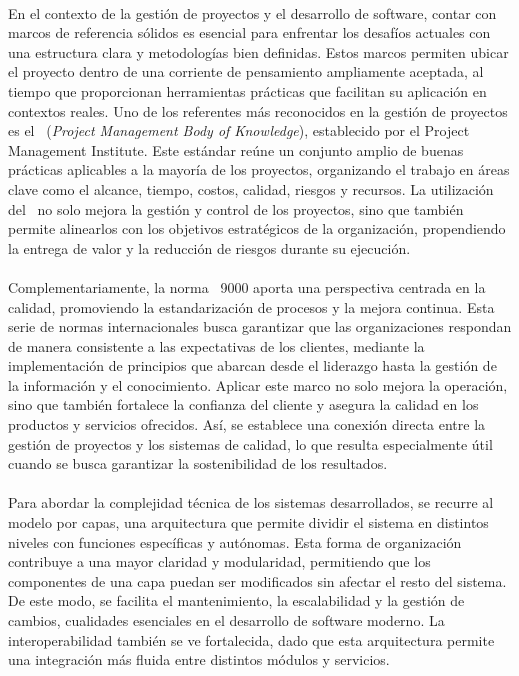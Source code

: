 \label{cap:marcoTeorico}
\mbox{}\\
En el contexto de la gestión de proyectos y el desarrollo de software, contar con marcos de referencia sólidos es esencial para enfrentar los desafíos actuales con una estructura clara y metodologías bien definidas. Estos marcos permiten ubicar el proyecto dentro de una corriente de pensamiento ampliamente aceptada, al tiempo que proporcionan herramientas prácticas que facilitan su aplicación en contextos reales. Uno de los referentes más reconocidos en la gestión de proyectos es el \PMBOK\ (\textit{Project Management Body of Knowledge}), establecido por el Project Management Institute. Este estándar reúne un conjunto amplio de buenas prácticas aplicables a la mayoría de los proyectos, organizando el trabajo en áreas clave como el alcance, tiempo, costos, calidad, riesgos y recursos\citep{project2017guia}. La utilización del \PMBOK\ no solo mejora la gestión y control de los proyectos, sino que también permite alinearlos con los objetivos estratégicos de la organización, propendiendo la entrega de valor y la reducción de riesgos durante su ejecución\citep{Monday2022}.\\\\
Complementariamente, la norma \ISO\ 9000 aporta una perspectiva centrada en la calidad, promoviendo la estandarización de procesos y la mejora continua\citep{ISO9001}. Esta serie de normas internacionales busca garantizar que las organizaciones respondan de manera consistente a las expectativas de los clientes, mediante la implementación de principios que abarcan desde el liderazgo hasta la gestión de la información y el conocimiento. Aplicar este marco no solo mejora la operación, sino que también fortalece la confianza del cliente y asegura la calidad en los productos y servicios ofrecidos\citep{Gray2022}. Así, se establece una conexión directa entre la gestión de proyectos y los sistemas de calidad, lo que resulta especialmente útil cuando se busca garantizar la sostenibilidad de los resultados.\\ \\
Para abordar la complejidad técnica de los sistemas desarrollados, se recurre al modelo por capas, una arquitectura que permite dividir el sistema en distintos niveles con funciones específicas y autónomas. Esta forma de organización contribuye a una mayor claridad y modularidad, permitiendo que los componentes de una capa puedan ser modificados sin afectar el resto del sistema\citep{Spray2023}. De este modo, se facilita el mantenimiento, la escalabilidad y la gestión de cambios, cualidades esenciales en el desarrollo de software moderno. La interoperabilidad también se ve fortalecida, dado que esta arquitectura permite una integración más fluida entre distintos módulos y servicios.\\ \\
